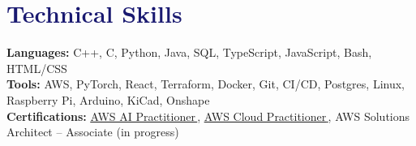 \documentclass[letterpaper,11pt]{article}
\newcommand{\cvlink}[2]{\href{#1}{\underline{#2}\,\raisebox{0.1\height}{\tiny\faExternalLink*}}}
\newcommand{\resumeText}[1]{\vspace{\textSectionGap}\small{#1}\vspace{\textSectionEnd}}
\newcommand\accentColor{MidnightBlue}
\newlength{\textSectionGap}\setlength{\textSectionGap}{3pt}     %
\newlength{\textSectionEnd}\setlength{\textSectionEnd}{-4pt}    %
\begin{document}
\section{\textcolor{\accentColor}{Technical Skills}}
\resumeText{\textbf{Languages: }{C++, C, Python, Java, SQL, TypeScript, JavaScript, Bash, HTML/CSS} \\
\textbf{Tools: }{AWS, PyTorch, React, Terraform, Docker, Git, CI/CD, Postgres, Linux, Raspberry Pi, Arduino, KiCad, Onshape} \\
\textbf{Certifications: }{\cvlink{https://www.credly.com/badges/20322967-3e11-4e5c-bc74-0ab3f855c4f0/public_url}{AWS AI Practitioner}, \cvlink{https://www.credly.com/badges/1793b980-30c3-4ba5-9b25-08277daedf15/public_url}{AWS Cloud Practitioner}, AWS Solutions Architect -- Associate (in progress)}}
\end{document}
